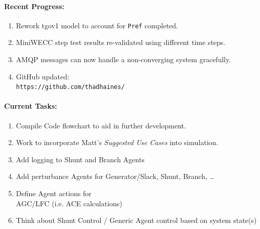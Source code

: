 \documentclass[12pt]{article}
\begin{document}
\begin{multicols}{2}

	\paragraph{Recent Progress:}
	\begin{enumerate}

		\item Rework tgov1 model to account for \verb|Pref| completed.

		\item MiniWECC step test results re-validated using different time steps.

		\item AMQP messages can now handle a non-converging system gracefully.
		

		\item GitHub updated:\\
		\verb|https://github.com/thadhaines/|
		
	\end{enumerate}
\paragraph{Current Tasks:}
	\begin{enumerate}

		\item Compile Code flowchart to aid in further development.

		\item Work to incorporate Matt's \emph{Suggested Use Cases} into simulation.

		\item Add logging to Shunt and Branch Agents
		
		\item Add perturbance Agents for Generator/Slack, Shunt, Branch, \ldots
		\item Define Agent actions for \\ AGC/LFC (i.e. ACE calculations)

		\item Think about Shunt Control / Generic Agent control based on system state(s)

		


\end{enumerate}
\end{multicols}
\end{document}
